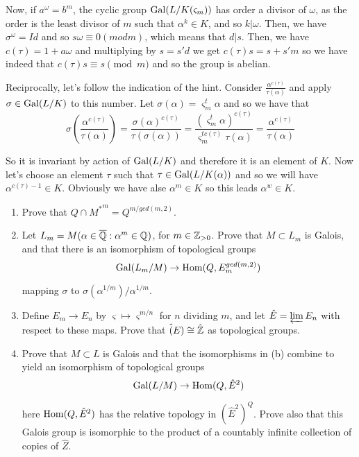 \begin{sol}
\begin{enumerate}[label=\alph*)]
		Now, if $a^{\omega} = b^m$, the cyclic group $\mathrm{Gal}(L/K(\varsigma_m))$ has order a divisor of $\omega$, as the order is the least divisor of $m$ such that $\alpha^k \in K$, and so $k | \omega$. Then, we have $\sigma^{\omega} = Id$ and so $s\omega \equiv 0 (mod m)$, which means that $d | s$. Then, we have $c(\tau) = 1 + a\omega$ and multiplying by $s = s'd$ we get $c(\tau)s = s + s'm$ so we have indeed that $c(\tau)s \equiv s \pmod{m}$ and so the group is abelian.

		Reciprocally, let's follow the indication of the hint. Consider $\frac{\alpha^{c(\tau)}}{\tau(\alpha)}$ and apply $\sigma \in \mathrm{Gal}(L/K)$ to this number. Let $\sigma(\alpha) = \varsigma_m^t \alpha$ and so we have that
		\[
			\sigma \left (\frac{\alpha^{c(\tau)}}{\tau(\alpha)} \right ) = \frac{\sigma(\alpha)^{c(\tau)}}{\tau(\sigma(\alpha))} = \frac{(\varsigma_m^t \alpha)^{c(\tau)}}{\varsigma_m^{tc(\tau)}\tau(\alpha)} = \frac{\alpha^{c(\tau)}}{\tau(\alpha)}
		\] 

		So it is invariant by action of $\mathrm{Gal}(L/K)$ and therefore it is an element of $K$. Now let's choose an element $\tau$ such that $\tau \in \mathrm{Gal}(L/K(\alpha))$ and so we will have $\alpha^{c(\tau)-1} \in K$. Obviously we have alse $\alpha^m \in K$ so this leads $\alpha^w \in K$.
	\end{enumerate}
\end{sol}

\begin{ex}
	\begin{enumerate}[label=\alph*)]
		\item Prove that $Q \cap {M^{*}}^m = Q^{m/gcd(m,2)}$.

		\item Let $L_m = M(\alpha \in \overline{\mathbb{Q}} : \alpha^m \in \mathbb{Q})$, for $m \in \mathbb{Z}_{>0}$. Prove that $M \subset L_m$ is Galois, and that there is an isomorphism of topological groups
		\[
			\mathrm{Gal}(L_m/M) \to \mathrm{Hom}(Q, E_m^{gcd(m,2)})
		\]

		mapping $\sigma$ to $\sigma(\alpha^{1/m})/\alpha^{1/m}$.

		\item Define $E_m \to E_n$ by $\varsigma \mapsto \varsigma^{m/n}$ for $n$ dividing $m$, and let $\hat{E} = \varprojlim E_n$ with respect to these maps. Prove that $\hat(E) \cong \hat{\mathbb{Z}}$ as topological groups.

		\item Prove that $M \subset L$ is Galois and that the isomorphisms in (b) combine to yield an isomorphism of topological groups
		\[
			\mathrm{Gal}(L/M) \to \mathrm{Hom}(Q, \hat{E}^2)
		\]

		here $\mathrm{Hom}(Q, \hat{E}^2)$ has the relative topology in $(\hat{E}^2)^Q$. Prove also that this Galois group is isomorphic to the product of a countably infinite collection of copies of $\hat{Z}$.
	\end{enumerate}
\end{ex}

